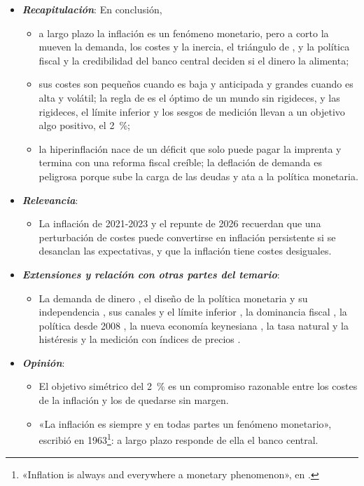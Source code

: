 \documentclass[11pt]{article}
\begin{document}
\begin{itemize}
\item \textbf{\emph{Recapitulación}}: En conclusión,
  \begin{itemize}
  \item a largo plazo la inflación es un fenómeno monetario, pero a corto la mueven la demanda, los costes y la inercia, el triángulo de , y la política fiscal y la credibilidad del banco central deciden si el dinero la alimenta;
  \item sus costes son pequeños cuando es baja y anticipada y grandes cuando es alta y volátil; la regla de  es el óptimo de un mundo sin rigideces, y las rigideces, el límite inferior y los sesgos de medición llevan a un objetivo algo positivo, el 2~\%;
  \item la hiperinflación nace de un déficit que solo puede pagar la imprenta y termina con una reforma fiscal creíble; la deflación de demanda es peligrosa porque sube la carga de las deudas y ata a la política monetaria.
  \end{itemize}
\item \textbf{\emph{Relevancia}}:
  \begin{itemize}
  \item La inflación de 2021-2023 y el repunte de 2026 recuerdan que una perturbación de costes puede convertirse en inflación persistente si se desanclan las expectativas, y que la inflación tiene costes desiguales.
  \end{itemize}
\item \textbf{\emph{Extensiones y relación con otras partes del temario}}:
  \begin{itemize}
  \item La demanda de dinero , el diseño de la política monetaria y su independencia , sus canales y el límite inferior , la dominancia fiscal , la política desde 2008 , la nueva economía keynesiana , la tasa natural y la histéresis  y la medición con índices de precios .
  \end{itemize}
\item \textbf{\emph{Opinión}}:
  \begin{itemize}
  \item El objetivo simétrico del 2~\% es un compromiso razonable entre los costes de la inflación y los de quedarse sin margen.

  \item «La inflación es siempre y en todas partes un fenómeno monetario», escribió  en 1963\footnote{«Inflation is always and everywhere a monetary phenomenon», en \textcite{Friedman1963Inflation}.}: a largo plazo responde de ella el banco central.


\end{itemize}
\end{itemize}
\end{document}
